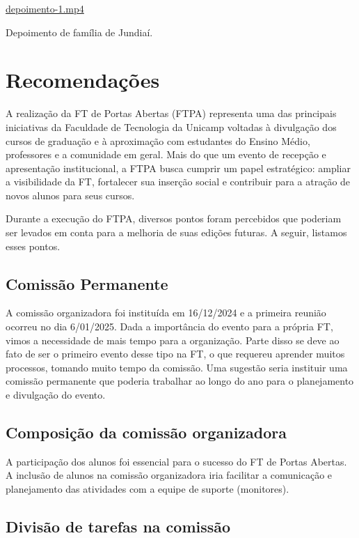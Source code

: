 \documentclass[
  letterpaper,
  DIV=11,
  numbers=noendperiod]{scrreprt}
\begin{document}
\url{depoimento-1.mp4}

Depoimento de família de Jundiaí.


\chapter{Recomendações}\label{recomendauxe7uxf5es}

A realização da FT de Portas Abertas (FTPA) representa uma das
principais iniciativas da Faculdade de Tecnologia da Unicamp voltadas à
divulgação dos cursos de graduação e à aproximação com estudantes do
Ensino Médio, professores e a comunidade em geral. Mais do que um evento
de recepção e apresentação institucional, a FTPA busca cumprir um papel
estratégico: ampliar a visibilidade da FT, fortalecer sua inserção
social e contribuir para a atração de novos alunos para seus cursos.

Durante a execução do FTPA, diversos pontos foram percebidos que
poderiam ser levados em conta para a melhoria de suas edições futuras. A
seguir, listamos esses pontos.

\section{Comissão Permanente}\label{comissuxe3o-permanente}

A comissão organizadora foi instituída em 16/12/2024 e a primeira
reunião ocorreu no dia 6/01/2025. Dada a importância do evento para a
própria FT, vimos a necessidade de mais tempo para a organização. Parte
disso se deve ao fato de ser o primeiro evento desse tipo na FT, o que
requereu aprender muitos processos, tomando muito tempo da comissão. Uma
sugestão seria instituir uma comissão permanente que poderia trabalhar
ao longo do ano para o planejamento e divulgação do evento.

\section{Composição da comissão
organizadora}\label{composiuxe7uxe3o-da-comissuxe3o-organizadora}

A participação dos alunos foi essencial para o sucesso do FT de Portas
Abertas. A inclusão de alunos na comissão organizadora iria facilitar a
comunicação e planejamento das atividades com a equipe de suporte
(monitores).

\section{Divisão de tarefas na
comissão}\label{divisuxe3o-de-tarefas-na-comissuxe3o}
\end{document}
